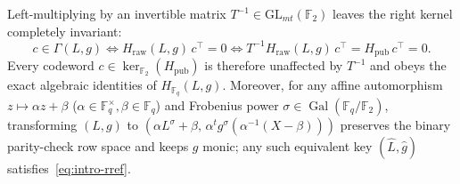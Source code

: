 \documentclass[11pt,a4paper]{article}
\theoremstyle{definition}
\theoremstyle{remark}
\newcommand{\F}{\mathbb{F}}
\begin{document}
Left-multiplying by an invertible matrix $T^{-1} \in \mathrm{GL}_{mt}(\F_2)$ leaves the right kernel completely invariant:
\begin{equation}
\label{eq:kernel-invariance}
    c \in \Gamma(L, g)
    \iff H_{\text{raw}}(L, g)\,c^\top = 0
    \iff T^{-1} H_{\text{raw}}(L, g)\,c^\top = H_{\text{pub}}\,c^\top = 0.
\end{equation}
Every codeword $c \in \ker_{\F_2}(H_{\text{pub}})$ is therefore unaffected by $T^{-1}$ and obeys the exact algebraic identities of $H_{\F_q}(L, g)$. Moreover, for any affine automorphism $z \mapsto \alpha z + \beta$ ($\alpha \in \F_q^\times, \beta \in \F_q$) and Frobenius power $\sigma \in \operatorname{Gal}(\F_q/\F_2)$, transforming $(L, g)$ to $(\alpha L^\sigma + \beta,\, \alpha^t g^\sigma(\alpha^{-1}(X - \beta)))$ preserves the binary parity-check row space and keeps $g$ monic; any such equivalent key $(\hat{L}, \hat{g})$ satisfies~\eqref{eq:intro-rref}.
\end{document}
